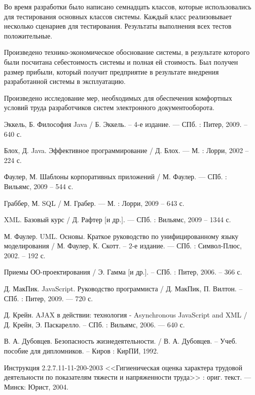 \documentclass[14pt,a4paper]{reportmod}
\begin{document}
Во время разработки было написано семнадцать классов, которые использовались для тестирования основных классов системы. Каждый класс реализовывает несколько сценариев для тестирования. Результаты выполнения всех тестов положительные.

Произведено технико-экономическое обоснование системы, в результате которого были посчитана себестоимость системы и полная ей стоимость. Был получен размер прибыли, который получит предприятие в результате внедрения разработанной системы в эксплуатацию.

Произведено исследование мер, необходимых для обеспечения комфортных условий труда разработчиков систем электронного документооборота.


\begin{thebibliography}{99}

 Эккель, Б. Философия Java / Б. Эккель. -- 4-е издание. --- СПб. : Питер, 2009. -- 640 с.

 Блох, Д. Java. Эффективное программирование / Д. Блох. --- М. : Лорри, 2002 -- 224 с.

 Фаулер, М. Шаблоны корпоративных приложений / М. Фаулер. --- СПб. : Вильямс, 2009 -- 544 с.

 Граббер, М. SQL / М. Грабер. --- М. : Лорри, 2009 -- 643 с.

 XML. Базовый курс / Д. Рафтер [и др.]. --- СПб. : Вильямс, 2009 -- 1344 с.

 М. Фаулер. UML. Основы. Краткое руководство по унифицированному языку моделирования / М. Фаулер, К. Скотт. -- 2-е издание. --- СПб. : Символ-Плюс, 2002. -- 192 с.

 Приемы ОО-проектирования / Э. Гамма [и др.]. -- СПб. : Питер, 2006. -- 366 с.

 Д. МакПик. JavaScript. Руководство программиста / Д. МакПик, П. Вилтон. -- СПб. : Питер, 2009. --- 720 с.

 Д. Крейн. AJAX в действии: технология - Asynchronous JavaScript and XML / Д. Крейн, Э. Паскарелло. -- СПб. : Вильямс, 2006. --- 640 с.

 В. А. Дубовцев. Безопасность жизнедеятельности. / В. А. Дубовцев. -- Учеб. пособие для дипломников. -- Киров : КирПИ, 1992.

 Инструкция 2.2.7.11-11-200-2003  <<Гигиеническая оценка характера трудовой деятельности по показателям тяжести и напряженности труда>> : ориг. текст. --- Минск: Юрист, 2004.


\end{thebibliography}
\end{document}
